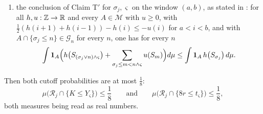 \begin{lemma}
\begin{enumerate}
\[    r^{-1}\bigl|x_n-x_{\sigma_j}-(t_n-t_{\sigma_j})p_j\bigr|
\]
is $\mu$-integrable and $\int\Upsilon\,d\mu\le C'(L_K+\sqrt{B_0})$;
\item\label{it:mcp-claimT} the conclusion of Claim T$'$ for
$\sigma_j,\varsigma$ on the window $(a,b)$, as stated in
: for all $h,u:\mathbb{Z}\to\mathbb{R}$ and every
$A\in\mathcal M$ with $u\ge0$, with
$\tfrac12(h(i+1)+h(i-1))-h(i)\le-u(i)$ for $a<i<b$, and with
$A\cap\{\sigma_j\le n\}\in\mathcal G_n$ for every $n$, one has for every $n$
\[
  \int\mathbf1_A\Bigl(h\bigl(S_{(\sigma_j\vee n)\wedge\varsigma}\bigr)
    +\sum_{\sigma_j\le m<n\wedge\varsigma}u(S_m)\Bigr)d\mu
  \le\int\mathbf1_A\,h\bigl(S_{\sigma_j}\bigr)\,d\mu .
\]
\end{enumerate}
Then both cutoff probabilities are at most $\tfrac18$:
\begin{equation}\label{eq:mcp-both}
  \mu\bigl(\mathcal R_j\cap\{K\le Y_{\varsigma}\}\bigr)\le\frac18
  \qquad\text{and}\qquad
  \mu\bigl(\mathcal R_j\cap\{8r\le t_{\varsigma}\}\bigr)\le\frac18 ,
\end{equation}
both measures being read as real numbers.
\end{lemma}
